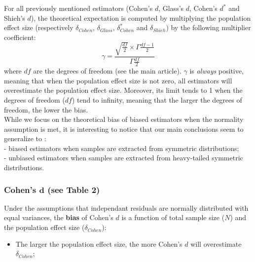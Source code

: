 \documentclass[
  english,
  man,mask]{apa6}
\providecommand{\tightlist}{%
  \setlength{\itemsep}{0pt}\setlength{\parskip}{0pt}}
\begin{document}
For all previously mentioned estimators (Cohen's \(d\), Glass's \(d\), Cohen's \(d^*\) and Shieh's \(d\)), the theoretical expectation is computed by multiplying the population effect size (respectively \(\delta_{Cohen}\), \(\delta_{Glass}\), \(\delta^*_{Cohen}\) and \(\delta_{Shieh}\)) by the following multiplier coefficient:
\begin{equation} 
\gamma=\frac{\sqrt{\frac{df}{2}} \times \Gamma{\frac{df-1}{2}}}{\Gamma{\frac{df}{2}}}
\label{eq:mc}
\end{equation}
where \(df\) are the degrees of freedom (see the main article). \(\gamma\) is \emph{always} positive, meaning that when the population effect size is not zero, all estimators will overestimate the population effect size. Moreover, its limit tends to 1 when the degrees of freedom (\(df\)) tend to infinity, meaning that the larger the degrees of freedom, the lower the bias.\\
While we focus on the theoretical bias of biased estimators when the normality assumption is met, it is interesting to notice that our main conclusions seem to generalize to :\\
- biased estimators when samples are extracted from symmetric distributions;\\
- unbiased estimators when samples are extracted from heavy-tailed symmetric distributions.

\hypertarget{cohens-bmd-see-table-2}{%
\subsubsection{\texorpdfstring{Cohen's \(\bm{d}\) (see Table 2)}{Cohen's \textbackslash bm\{d\} (see Table 2)}}\label{cohens-bmd-see-table-2}}

Under the assumptions that independant residuals are normally distributed with equal variances, the \textbf{bias} of Cohen's \(d\) is a function of total sample size (\(N\)) and the population effect size (\(\delta_{Cohen}\)):

\begin{itemize}
\tightlist
\item
  The larger the population effect size, the more Cohen's \(d\) will overestimate \(\delta_{Cohen}\);
\end{itemize}
\end{document}
